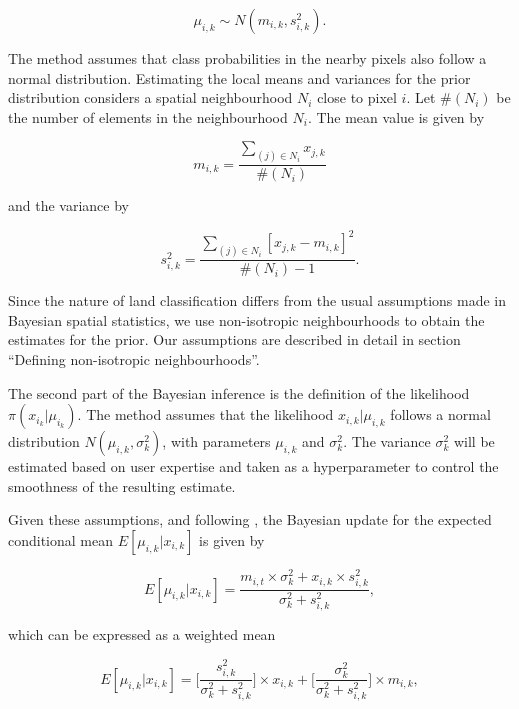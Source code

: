 \documentclass[
  shortnames]{jss}
\begin{document}
\begin{equation}
    \mu_{i,k} \sim N(m_{i,k}, s^2_{i,k}).
\end{equation}

The method assumes that class probabilities in the nearby pixels also follow a normal distribution. Estimating the local means and variances for the prior distribution considers a spatial neighbourhood \(N_{i}\) close to pixel \(i\). Let \(\#(N_{i})\) be the number of elements in the neighbourhood \(N_{i}\). The mean value is given by

\begin{equation}
m_{i,k} = \frac{\sum_{(j) \in N_{i}} x_{j,k}}{\#(N_{i})}
\end{equation}

and the variance by

\begin{equation}
s^2_{i,k} = \frac{\sum_{(j) \in N_{i}} [x_{j,k} - m_{i,k}]^2}{\#(N_{i})-1}.
\end{equation}

Since the nature of land classification differs from the usual assumptions made in Bayesian spatial statistics, we use non-isotropic neighbourhoods to obtain the estimates for the prior. Our assumptions are described in detail in section ``Defining non-isotropic neighbourhoods''.

The second part of the Bayesian inference is the definition of the likelihood \(\pi(x_{i_k}|\mu_{i_k})\). The method assumes that the likelihood \(x_{i,k} | \mu_{i,k}\) follows a normal distribution \(N(\mu_{i,k}, \sigma^2_{k})\), with parameters \(\mu_{i,k}\) and \(\sigma^2_{k}\). The variance \(\sigma^2_{k}\) will be estimated based on user expertise and taken as a hyperparameter to control the smoothness of the resulting estimate.

Given these assumptions, and following \citet{Gelman2014}, the Bayesian update for the expected conditional mean \({E}[\mu_{i,k} | x_{i,k}]\) is given by

\begin{equation}
{E}[\mu_{i,k} | x_{i,k}] = \frac{m_{i,t} \times \sigma^2_{k} +
x_{i,k} \times s^2_{i,k}}{ \sigma^2_{k} +s^2_{i,k}},
\end{equation}

which can be expressed as a weighted mean

\begin{equation}
{E}[\mu_{i,k} | x_{i,k}] =
\Biggl [ \frac{s^2_{i,k}}{\sigma^2_{k} +s^2_{i,k}} \Biggr ] \times
x_{i,k} +
\Biggl [ \frac{\sigma^2_{k}}{\sigma^2_{k} +s^2_{i,k}} \Biggr ] \times m_{i,k},
\end{equation}
\end{document}
